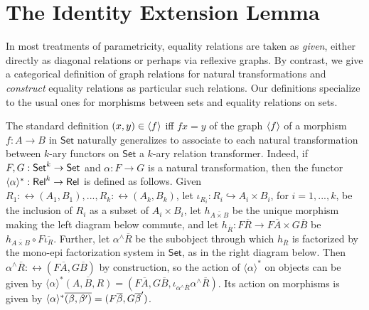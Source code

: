 \documentclass[runningheads]{llncs}
\newcommand{\set}{\mathsf{Set}}
\begin{document}
\vspace*{-0.1in}

\section{The Identity Extension Lemma}\label{sec:iel}

\vspace*{-0.1in}

In most treatments of parametricity, equality relations are taken as
{\em given}, either directly as diagonal relations or perhaps via
reflexive graphs.  By contrast, we give a categorical definition of
graph relations for natural transformations and {\em construct}
equality relations as particular such relations. Our definitions
specialize to the usual ones for morphisms between sets and equality
relations on sets.

The standard definition $(x,y) \in \langle {f} \rangle$ iff $fx = y$ of the
graph $\langle {f} \rangle$ of a morphism $f : A \to B$ in $\set$ naturally
generalizes to associate to each natural transformation between
$k$-ary functors on $\set$ a $k$-ary relation transformer. Indeed, if
$F, G: \mathsf{Set}^k \to \mathsf{Set}$ and $\alpha : F \to G$ is a natural
transformation, then the functor $\langle {\alpha} \rangle^*: \mathsf{Rel}^k \to \mathsf{Rel}$
is defined as follows. Given $R_1 : \rel(A_1, B_1),...,R_k :
\rel(A_k,B_k)$, let $\iota_{R_i} : R_i \hookrightarrow A_i \times
B_i$, for $i = 1,...,k$, be the inclusion of $R_i$ as a subset of $A_i
\times B_i$, let $h_{\overline{A \times B}}$ be the unique morphism
making the left diagram below commute, and let $h_{\overline{R}} :
F\overline{R} \to F\overline{A} \times G\overline{B}$ be
$h_{\overline{A \times B}} \circ F\overline{\iota_R}$.  Further, let
$\alpha^\wedge\overline{R}$ be the subobject through which
$h_{\overline{R}}$ is factorized by the mono-epi factorization system
in $\set$, as in the right diagram below. Then
$\alpha^\wedge\overline{R} : \rel(F\overline{A}, G\overline{B})$ by
construction, so the action of $\langle \alpha \rangle^*$ on objects
can be given by $\langle \alpha \rangle^* \overline{(A,B,R)} =
(F\overline{A}, G\overline{B}, \iota_{\alpha^\wedge
  \overline{R}}\alpha^\wedge\overline{R})$. Its action on morphisms is
given by $\langle {\alpha} \rangle^*\overline{(\beta, \beta')} =
(F\overline\beta, G\overline\beta')$.
\end{document}
